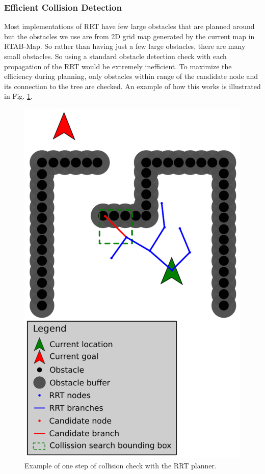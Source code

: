 \documentclass[letterpaper, 10 pt, conference]{ieeeconf}  %
\begin{document}
\subsubsection{Efficient Collision Detection}
Most implementations of RRT have few large obstacles that are planned around but the obstacles we use are from 2D grid map generated by the current map in RTAB-Map. So rather than having just a few large obstacles, there are many small obstacles. So using a standard obstacle detection check with each propagation of the RRT would be extremely inefficient. To maximize the efficiency during planning, only obstacles within range of the candidate node and its connection to the tree are checked. An example of how this works is illustrated in Fig. \ref{fig:rrt_sample}.

\begin{figure}
\centering
\includegraphics[width=0.8\linewidth]{rrt_sample}
\caption{Example of one step of collision check with the RRT planner.}
\label{fig:rrt_sample}
\end{figure}
\end{document}
